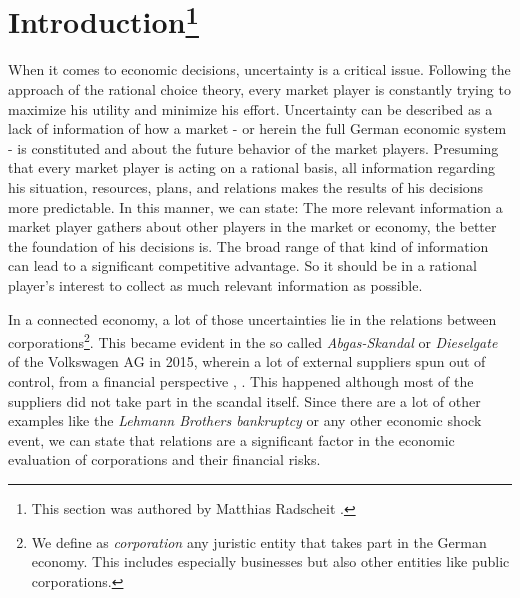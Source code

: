 \section*{Introduction\footnote{This section was authored by Matthias Radscheit \cite{loeperradscheit}.}}
\label{sec:Introduction}
When it comes to economic decisions, uncertainty is a critical issue. Following the approach of the rational choice theory, every market player is constantly trying to maximize his utility and minimize his effort. Uncertainty can be described as a lack of information of how a market - or herein the full German economic system - is constituted and about the future behavior of the market players. Presuming that every market player is acting on a rational basis, all information regarding his situation, resources, plans, and relations makes the results of his decisions more predictable. In this manner, we can state: The more relevant information a market player gathers about other players in the market or economy, the better the foundation of his decisions is. The broad range of that kind of information can lead to a significant competitive advantage. So it should be in a rational player's interest to collect as much relevant information as possible.\par
In a connected economy, a lot of those uncertainties lie in the relations between corporations\footnote{We define as \emph{corporation} any juristic entity that takes part in the German economy. This includes especially businesses but also other entities like public corporations.}. This became evident in the so called \emph{Abgas-Skandal} or \emph{Dieselgate} of the Volkswagen AG in 2015, wherein a lot of external suppliers spun out of control, from a financial perspective \cite{stuttzeit}, \cite{automobilwoche}. This happened although most of the suppliers did not take part in the scandal itself. Since there are a lot of other examples like the \emph{Lehmann Brothers bankruptcy} or any other economic shock event, we can state that relations are a significant factor in the economic evaluation of corporations and their financial risks.\par

